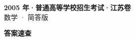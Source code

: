 \documentclass[zihao=-4, a4paper]{ctexart}
\begin{document}
\begin{center}
  {\Large\bfseries 2005 年·普通高等学校招生考试·江苏卷}\\[4pt]
  {\large 数学 · 简答版}
\end{center}
\medskip
{}

\clearpage
{}
\begin{center}{\Large\bfseries 答案速查}\end{center}
\medskip

\end{document}
